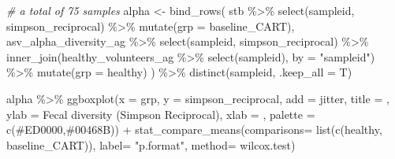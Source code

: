 \documentclass[
]{book}
\newenvironment{Shaded}{\begin{snugshade}}{\end{snugshade}}
\newcommand{\AttributeTok}[1]{\textcolor[rgb]{0.77,0.63,0.00}{#1}}
\newcommand{\CommentTok}[1]{\textcolor[rgb]{0.56,0.35,0.01}{\textit{#1}}}
\newcommand{\FunctionTok}[1]{\textcolor[rgb]{0.00,0.00,0.00}{#1}}
\newcommand{\NormalTok}[1]{#1}
\newcommand{\OtherTok}[1]{\textcolor[rgb]{0.56,0.35,0.01}{#1}}
\newcommand{\SpecialCharTok}[1]{\textcolor[rgb]{0.00,0.00,0.00}{#1}}
\newcommand{\StringTok}[1]{\textcolor[rgb]{0.31,0.60,0.02}{#1}}
\begin{document}
\begin{Shaded}
\begin{Highlighting}[]
\CommentTok{\# a total of 75 samples }
\NormalTok{alpha }\OtherTok{\textless{}{-}} \FunctionTok{bind\_rows}\NormalTok{(}
\NormalTok{  stb }\SpecialCharTok{\%\textgreater{}\%} \FunctionTok{select}\NormalTok{(sampleid, simpson\_reciprocal) }\SpecialCharTok{\%\textgreater{}\%} \FunctionTok{mutate}\NormalTok{(}\AttributeTok{grp =} \StringTok{\textquotesingle{}baseline\_CART\textquotesingle{}}\NormalTok{),}
\NormalTok{  asv\_alpha\_diversity\_ag }\SpecialCharTok{\%\textgreater{}\%} 
    \FunctionTok{select}\NormalTok{(sampleid, simpson\_reciprocal) }\SpecialCharTok{\%\textgreater{}\%} 
    \FunctionTok{inner\_join}\NormalTok{(healthy\_volunteers\_ag }\SpecialCharTok{\%\textgreater{}\%} \FunctionTok{select}\NormalTok{(sampleid), }\AttributeTok{by =} \StringTok{"sampleid"}\NormalTok{) }\SpecialCharTok{\%\textgreater{}\%} 
    \FunctionTok{mutate}\NormalTok{(}\AttributeTok{grp =} \StringTok{\textquotesingle{}healthy\textquotesingle{}}\NormalTok{)}
\NormalTok{) }\SpecialCharTok{\%\textgreater{}\%} 
  \FunctionTok{distinct}\NormalTok{(sampleid, }\AttributeTok{.keep\_all =}\NormalTok{ T)}

\NormalTok{alpha }\SpecialCharTok{\%\textgreater{}\%} 
  \FunctionTok{ggboxplot}\NormalTok{(}\AttributeTok{x =} \StringTok{\textquotesingle{}grp\textquotesingle{}}\NormalTok{, }\AttributeTok{y =} \StringTok{\textquotesingle{}simpson\_reciprocal\textquotesingle{}}\NormalTok{, }\AttributeTok{add =} \StringTok{\textquotesingle{}jitter\textquotesingle{}}\NormalTok{,}
            \AttributeTok{title =} \StringTok{\textquotesingle{}\textquotesingle{}}\NormalTok{, }\AttributeTok{ylab =} \StringTok{\textquotesingle{}Fecal diversity (Simpson Reciprocal)\textquotesingle{}}\NormalTok{, }\AttributeTok{xlab =} \StringTok{\textquotesingle{}\textquotesingle{}}\NormalTok{, }
            \AttributeTok{palette =} \FunctionTok{c}\NormalTok{(}\StringTok{\textquotesingle{}\#ED0000\textquotesingle{}}\NormalTok{,}\StringTok{\textquotesingle{}\#00468B\textquotesingle{}}\NormalTok{)) }\SpecialCharTok{+}
            \FunctionTok{stat\_compare\_means}\NormalTok{(}\AttributeTok{comparisons=} \FunctionTok{list}\NormalTok{(}\FunctionTok{c}\NormalTok{(}\StringTok{\textquotesingle{}healthy\textquotesingle{}}\NormalTok{, }\StringTok{\textquotesingle{}baseline\_CART\textquotesingle{}}\NormalTok{)),}
            \AttributeTok{label=} \StringTok{"p.format"}\NormalTok{,}
            \AttributeTok{method=} \StringTok{\textquotesingle{}wilcox.test\textquotesingle{}}\NormalTok{)}
\end{Highlighting}
\end{Shaded}
\end{document}
